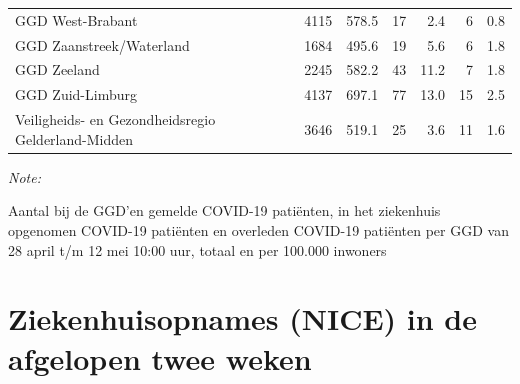 \documentclass[
  english,
  man,floatsintext]{apa6}
\begin{document}
\begin{table}
\begin{threeparttable}
\begin{tabular}{lrrrrrr}
GGD West-Brabant & 4115 & 578.5 & 17 & 2.4 & 6 & 0.8\\
GGD Zaanstreek/Waterland & 1684 & 495.6 & 19 & 5.6 & 6 & 1.8\\
GGD Zeeland & 2245 & 582.2 & 43 & 11.2 & 7 & 1.8\\
GGD Zuid-Limburg & 4137 & 697.1 & 77 & 13.0 & 15 & 2.5\\
Veiligheids- en Gezondheidsregio Gelderland-Midden & 3646 & 519.1 & 25 & 3.6 & 11 & 1.6\\
\bottomrule
\end{tabular}
\begin{tablenotes}
\item \textit{Note: } 
\item Aantal bij de GGD’en gemelde COVID-19 patiënten, in het ziekenhuis opgenomen COVID-19 patiënten en overleden COVID-19 patiënten per GGD van 28 april t/m 12 mei 10:00 uur, totaal en per 100.000 inwoners
\end{tablenotes}
\end{threeparttable}
\endgroup{}
\end{table}

\newpage

\hypertarget{ziekenhuisopnames-nice-in-de-afgelopen-twee-weken}{%
\section{Ziekenhuisopnames (NICE) in de afgelopen twee weken}\label{ziekenhuisopnames-nice-in-de-afgelopen-twee-weken}}
\end{document}
